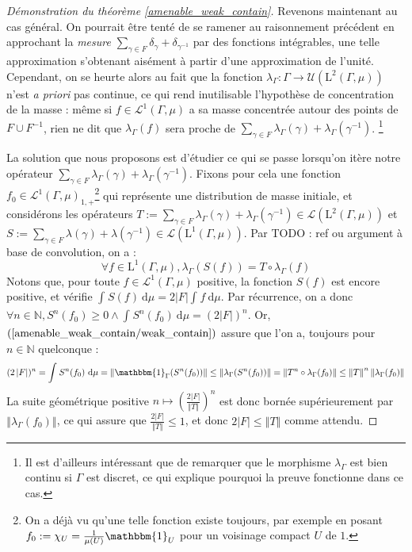 \documentclass[a4paper,12pt]{article}
\newcommand{\N}{\mathbb{N}}
\newcommand{\norm}[1]{\left\Vert #1\right\Vert}
\newcommand{\abs}[1]{\left\vert#1\right\vert}
\newcommand{\card}[1]{\abs{#1}}
\newcommand{\indic}{\mathbbm{1}}
\newcommand{\integral}[4]{\int_{#1}^{#2} #3~\mathrm{d}#4}
\newcommand{\inv}{^{-1}}
\newcommand{\comp}{\circ}
\newcommand{\TODO}[1]{{\color{red}TODO :} #1}
\begin{document}
\begin{proof}[Démonstration du théorème \ref{amenable_weak_contain}]
    Revenons maintenant au cas général. On pourrait être tenté de se ramener au raisonnement précédent 
    en approchant la \emph{mesure} $\sum_{\gamma\in F}\delta_\gamma + \delta_{\gamma\inv}$ par des fonctions intégrables,
    une telle approximation s'obtenant aisément à partir d'une approximation de l'unité. Cependant,
    on se heurte alors au fait que la fonction $\lambda_\Gamma : \Gamma \to \mathcal{U}(\mathrm{L}^2(\Gamma, \mu))$
    n'est \emph{a priori} pas continue, ce qui rend inutilisable l'hypothèse de concentration de la masse : 
    même si $f\in\mathscr{L}^1(\Gamma, \mu)$ a sa masse concentrée autour des points de $F\cup F\inv$,
    rien ne dit que $\lambda_\Gamma(f)$ sera proche de $\sum_{\gamma\in F}\lambda_\Gamma(\gamma) + \lambda_\Gamma(\gamma\inv)$. 
    \footnote{Il est d'ailleurs intéressant que de remarquer que le morphisme $\lambda_\Gamma$ est bien continu
    si $\Gamma$ est discret, ce qui explique pourquoi la preuve fonctionne dans ce cas.}

    La solution que nous proposons est d'étudier ce qui se passe lorsqu'on itère notre opérateur $\sum_{\gamma\in F}\lambda_\Gamma(\gamma) + \lambda_\Gamma(\gamma\inv)$.
    Fixons pour cela une fonction $f_0\in\mathscr{L}^1(\Gamma, \mu)_{1, +}$\footnote{On a déjà vu qu'une telle fonction existe toujours, par exemple en posant $f_0:=\chi_U=\frac{1}{\mu(U)}\indic_U$ pour 
    un voisinage compact $U$ de $1$.} qui représente une distribution de masse initiale, et considérons les opérateurs $T := \sum_{\gamma\in F}\lambda_\Gamma(\gamma) + \lambda_\Gamma(\gamma\inv) \in\mathcal{L}(\mathrm{L}^2(\Gamma, \mu))$
    et $S := \sum_{\gamma\in F}\lambda(\gamma) + \lambda(\gamma\inv) \in \mathcal{L}(\mathrm{L}^1(\Gamma, \mu))$. Par \TODO{ref ou argument à base de convolution}, on a :
    \begin{equation*}
        \forall f\in\mathrm{L}^1(\Gamma, \mu), \lambda_\Gamma(S(f)) = T \comp \lambda_\Gamma(f)
    \end{equation*}
    Notons que, pour toute $f\in\mathscr{L}^1(\Gamma, \mu)$ positive, la fonction $S(f)$ est encore positive, et vérifie $\integral{}{}{S(f)}{\mu} = 2\card{F}\integral{}{}{f}{\mu}$.
    Par récurrence, on a donc $\forall n\in\N, S^n(f_0)\geq0 \land \integral{}{}{S^n(f_0)}{\mu} = (2\card{F})^n$. Or, $(\ref{amenable_weak_contain/weak_contain})$
    assure que l'on a, toujours pour $n\in\N$ quelconque :
    \begin{equation*}
        (2\card{F})^n = \integral{}{}{S^n(f_0)}{\mu} = \norm{\indic_\Gamma(S^n(f_0))} \leq \norm{\lambda_\Gamma(S^n(f_0))} = \norm{T^n \comp \lambda_\Gamma(f_0)} \le \norm{T}^n \norm{\lambda_\Gamma(f_0)}
    \end{equation*}
    La suite géométrique positive $n\mapsto\left(\frac{2\card{F}}{\norm{T}}\right)^n$ est donc bornée supérieurement par $\norm{\lambda_\Gamma(f_0)}$, ce qui assure que $\frac{2\card{F}}{\norm{T}} \leq 1$,
    et donc $2\card{F}\leq\norm{T}$ comme attendu.


\end{proof}
\end{document}

